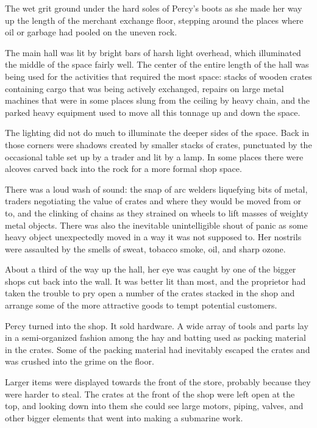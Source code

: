 \documentclass[
]{scrbook}
\begin{document}
The wet grit ground under the hard soles of Percy's boots as she made
her way up the length of the merchant exchange floor, stepping around
the places where oil or garbage had pooled on the uneven rock.

The main hall was lit by bright bars of harsh light overhead, which
illuminated the middle of the space fairly well. The center of the
entire length of the hall was being used for the activities that
required the most space: stacks of wooden crates containing cargo that
was being actively exchanged, repairs on large metal machines that were
in some places slung from the ceiling by heavy chain, and the parked
heavy equipment used to move all this tonnage up and down the space.

The lighting did not do much to illuminate the deeper sides of the
space. Back in those corners were shadows created by smaller stacks of
crates, punctuated by the occasional table set up by a trader and lit by
a lamp. In some places there were alcoves carved back into the rock for
a more formal shop space.

There was a loud wash of sound: the snap of arc welders liquefying bits
of metal, traders negotiating the value of crates and where they would
be moved from or to, and the clinking of chains as they strained on
wheels to lift masses of weighty metal objects. There was also the
inevitable unintelligible shout of panic as some heavy object
unexpectedly moved in a way it was not supposed to. Her nostrils were
assaulted by the smells of sweat, tobacco smoke, oil, and sharp ozone.

About a third of the way up the hall, her eye was caught by one of the
bigger shops cut back into the wall. It was better lit than most, and
the proprietor had taken the trouble to pry open a number of the crates
stacked in the shop and arrange some of the more attractive goods to
tempt potential customers.

Percy turned into the shop. It sold hardware. A wide array of tools and
parts lay in a semi-organized fashion among the hay and batting used as
packing material in the crates. Some of the packing material had
inevitably escaped the crates and was crushed into the grime on the
floor.

Larger items were displayed towards the front of the store, probably
because they were harder to steal. The crates at the front of the shop
were left open at the top, and looking down into them she could see
large motors, piping, valves, and other bigger elements that went into
making a submarine work.
\end{document}
